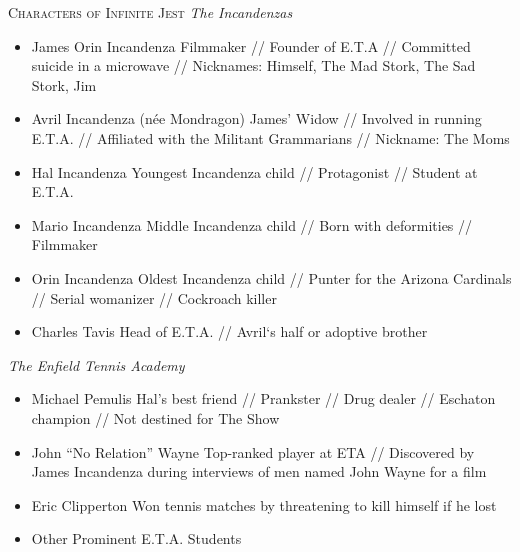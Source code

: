 \documentclass{article}
\begin{document}
\centering
\newpage
\begin{tcolorbox}[height=26cm]
\centering
\huge\textsc{Characters of Infinite Jest}
\small
\vspace{0.3cm}
\decorule
\vspace{0.3cm}
\large\emph{The Incandenzas}
\small
\begin{itemize}
\item James Orin Incandenza\newline
\scriptsize{Filmmaker // Founder of E.T.A // Committed suicide in a microwave // Nicknames: Himself, The Mad Stork, The Sad Stork, Jim}
\item \small{Avril Incandenza (n\'{e}e Mondragon)}\newline
\scriptsize{James' Widow // Involved in running E.T.A. // Affiliated with the Militant Grammarians // Nickname: The Moms}
\item \small{Hal Incandenza}\newline
\scriptsize{Youngest Incandenza child // Protagonist // Student at E.T.A.}
\item  \small{Mario Incandenza}\newline
\scriptsize{Middle Incandenza child // Born with deformities // Filmmaker}
\item  \small{Orin Incandenza}\newline
\scriptsize {Oldest Incandenza child // Punter for the Arizona Cardinals // Serial womanizer // Cockroach killer}
\item  \small{Charles Tavis}\newline
\scriptsize{Head of E.T.A. // Avril`s half or adoptive brother
}
\end{itemize}
\vspace{0.1cm}
\large\emph{The Enfield Tennis Academy}
\small
\begin{itemize}
\item  \small{Michael Pemulis}\newline
\scriptsize{Hal's best friend // Prankster // Drug dealer //  Eschaton champion // Not destined for The Show}
\item  \small{John ``No Relation'' Wayne}\newline
\scriptsize{Top-ranked player at ETA // Discovered by James Incandenza during interviews of men named John Wayne for a film}
\item  \small{Eric Clipperton}\newline
\scriptsize{Won tennis matches by threatening to kill himself if he lost}
\item  \small{Other Prominent E.T.A. Students}\newline

\end{itemize}
\end{tcolorbox}
\end{document}
